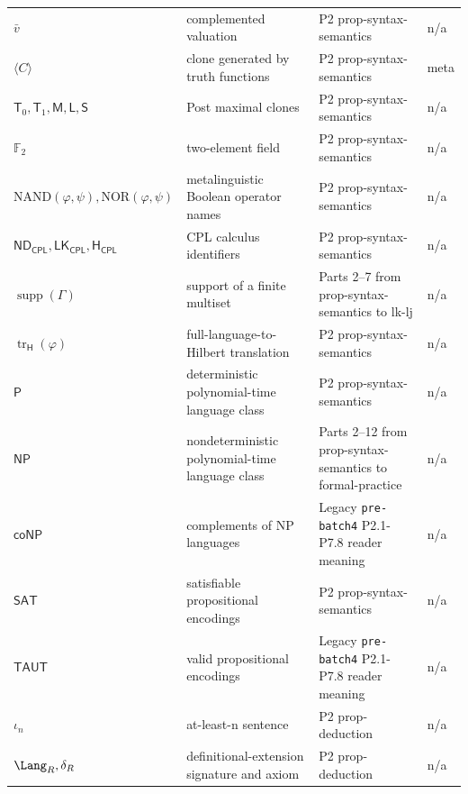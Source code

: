 \begin{longtable}{@{}p{}p{}p{}p{}@{}}
\(\bar v\) & complemented valuation & P2 prop-\allowbreak{}syntax-\allowbreak{}semantics & n/a \\
\(\langle C\rangle\) & clone generated by truth functions & P2 prop-\allowbreak{}syntax-\allowbreak{}semantics & meta \\
\(\mathsf T_0,\allowbreak \mathsf T_1,\allowbreak \mathsf M,\allowbreak \mathsf L,\allowbreak \mathsf S\) & Post maximal clones & P2 prop-\allowbreak{}syntax-\allowbreak{}semantics & n/a \\
\(\mathbb F_2\) & two-element field & P2 prop-\allowbreak{}syntax-\allowbreak{}semantics & n/a \\
\(\mathrm{NAND}(\varphi,\allowbreak \psi),\allowbreak \mathrm{NOR}(\varphi,\allowbreak \psi)\) & metalinguistic Boolean operator names & P2 prop-\allowbreak{}syntax-\allowbreak{}semantics & n/a \\
\(\mathsf{ND}_{\mathsf{CPL}},\allowbreak \mathsf{LK}_{\mathsf{CPL}},\allowbreak \mathsf H_{\mathsf{CPL}}\) & CPL calculus identifiers & P2 prop-\allowbreak{}syntax-\allowbreak{}semantics & n/a \\
\(\operatorname{supp}(\Gamma)\) & support of a finite multiset & Parts 2--7 from prop-\allowbreak{}syntax-\allowbreak{}semantics to lk-\allowbreak{}lj & n/a \\
\(\operatorname{tr}_{\mathsf H}(\varphi)\) & full-language-to-Hilbert translation & P2 prop-\allowbreak{}syntax-\allowbreak{}semantics & n/a \\
\(\mathsf P\) & deterministic polynomial-time language class & P2 prop-\allowbreak{}syntax-\allowbreak{}semantics & n/a \\
\(\mathsf{NP}\) & nondeterministic polynomial-time language class & Parts 2--12 from prop-\allowbreak{}syntax-\allowbreak{}semantics to formal-\allowbreak{}practice & n/a \\
\(\mathsf{coNP}\) & complements of NP languages & Legacy \texttt{pre-\allowbreak{}batch4} P2.\allowbreak{}1-\allowbreak{}P7.\allowbreak{}8 reader meaning & n/a \\
\(\mathsf{SAT}\) & satisfiable propositional encodings & P2 prop-\allowbreak{}syntax-\allowbreak{}semantics & n/a \\
\(\mathsf{TAUT}\) & valid propositional encodings & Legacy \texttt{pre-\allowbreak{}batch4} P2.\allowbreak{}1-\allowbreak{}P7.\allowbreak{}8 reader meaning & n/a \\
\(\iota_n\) & at-least-n sentence & P2 prop-\allowbreak{}deduction & n/a \\
\(\Lang_R,\allowbreak \delta_R\) & definitional-extension signature and axiom & P2 prop-\allowbreak{}deduction & n/a \\

\end{longtable}
